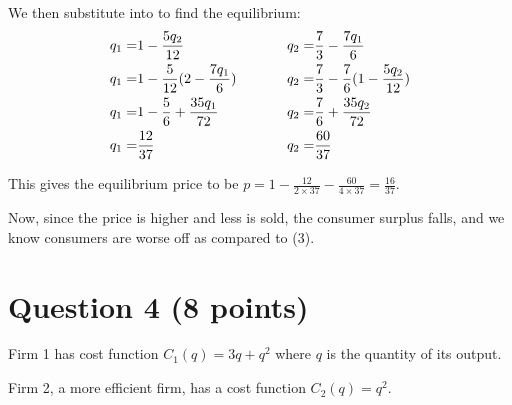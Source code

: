 \documentclass{article}
\newenvironment{solution}{\color{red}}{\color{black}}
\begin{document}
\begin{solution}
\begin{enumerate}
We then substitute into to find the equilibrium:
\begin{equation*}
\begin{aligned}
q_{1} =& 1 - \frac{5q_{2}}{12} \\
q_{1} =& 1 - \frac{5}{12}(2 - \frac{7q_{1}}{6}) \\
q_{1} =& 1 - \frac{5}{6} + \frac{35q_{1}}{72} \\
q_{1} =& \frac{12}{37} \\
\end{aligned}
\hspace{.5in}
\begin{aligned}
q_{2} =& \frac{7}{3} - \frac{7q_{1}}{6} \\
q_{2} =& \frac{7}{3} - \frac{7}{6}(1 - \frac{5q_{2}}{12}) \\
q_{2} =& \frac{7}{6} + \frac{35q_{2}}{72} \\
q_{2} =& \frac{60}{37} \\
\end{aligned}
\end{equation*}

This gives the equilibrium price to be $p = 1 - \frac{12}{2\times 37} - \frac{60}{4 \times 37}=\frac{16}{37}$.

Now, since the price is higher and less is sold, the consumer surplus falls, and we know consumers are worse off as compared to (3).
\end{enumerate}
\end{solution}

\section*{Question 4 (8 points)}
Firm 1 has cost function $C_1 (q) = 3 q + q^2$ where $q$ is the quantity of its output.

Firm 2, a more efficient firm, has a cost function $C_2 (q) = q^2$.
\end{document}
